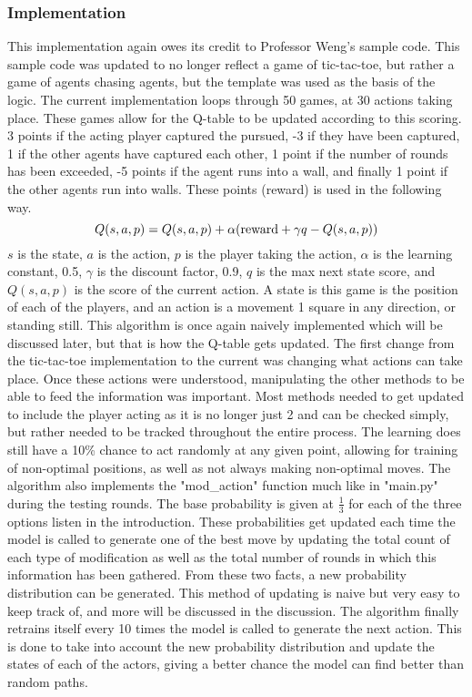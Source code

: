\documentclass[letterpaper, 10 pt, conference]{ieeeconf}   %
\begin{document}
\subsubsection{Implementation}
This implementation again owes its credit to Professor Weng's sample code. This sample code was updated to no longer
reflect a game of tic-tac-toe, but rather a game of agents chasing agents, but the template was used as the basis of the logic.
The current implementation loops through 50 games, at 30 actions taking place. These games allow for the Q-table to be updated according to
this scoring. 3 points if the acting player captured the pursued, -3 if they have been captured, 1 if the other agents have captured each other,
1 point if the number of rounds has been exceeded, -5 points if the agent runs into a wall, and finally 1 point if the other agents run into walls.
These points (reward) is used in the following way.
$$Q(s, a, p) = Q(s, a, p) + \alpha(\textnormal{reward} + \gamma q - Q(s, a, p))$$
$s$ is the state, $a$ is the action, $p$ is the player taking the action, $\alpha$ is the learning constant, 0.5, $\gamma$ is the discount factor, 0.9,
$q$ is the max next state score, and $Q(s, a, p)$ is the score of the current action.
A state is this game is the position of each of the players, and an action is a movement 1 square in any direction, or standing still.
This algorithm is once again naively implemented which will be
discussed later, but that is how the Q-table gets updated. The first change from the tic-tac-toe implementation to the current was changing what actions can take place.
Once these actions were understood, manipulating the other methods to be able to feed the information was important. Most methods needed to get updated to include
the player acting as it is no longer just 2 and can be checked simply, but rather needed to be tracked throughout the entire process. The learning does still have
a 10\% chance to act randomly at any given point, allowing for training of non-optimal positions, as well as not always making non-optimal moves.
The algorithm also implements the "mod\_action" function much like in "main.py" during the testing rounds. The base probability is given at $\frac13$ for each of the three options
listen in the introduction. These probabilities get updated each time the model is called to generate one of the best move by updating the total count of each type of modification as well
as the total number of rounds in which this information has been gathered. From these two facts, a new probability distribution can be generated. This method of updating is naive but
very easy to keep track of, and more will be discussed in the discussion.
The algorithm finally retrains itself every 10 times the model is called to generate the next action. This is done to take into account the new probability distribution and update
the states of each of the actors, giving a better chance the model can find better than random paths.
\end{document}
